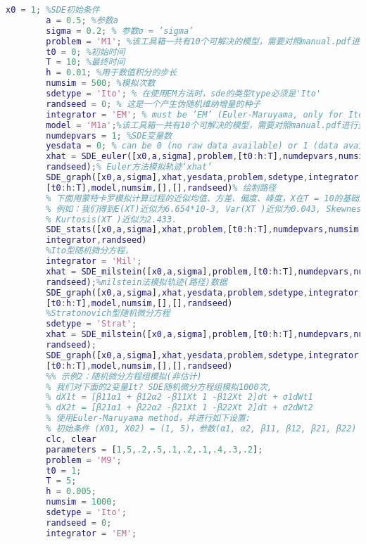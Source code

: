 \begin{lstlisting}[language= Matlab]
        x0 = 1; %SDE初始条件
        a = 0.5; %参数a
        sigma = 0.2; % 参数σ = ’sigma’
        problem = 'M1'; %该工具箱一共有10个可解决的模型，需要对照manual.pdf进行查看
        t0 = 0; %初始时间
        T = 10; %最终时间
        h = 0.01; %用于数值积分的步长
        numsim = 500; %模拟次数
        sdetype = 'Ito'; % 在使用EM方法时，sde的类型type必须是'Ito'
        randseed = 0; % 这是一个产生伪随机维纳增量的种子
        integrator = 'EM'; % must be ’EM’ (Euler-Maruyama, only for Ito SDEs) or ’Mil’
        model = 'M1a';%该工具箱一共有10个可解决的模型，需要对照manual.pdf进行查看
        numdepvars = 1; %SDE变量数
        yesdata = 0; % can be 0 (no raw data available) or 1 (data available)
        xhat = SDE_euler([x0,a,sigma],problem,[t0:h:T],numdepvars,numsim,sdetype,...
        randseed);% Euler方法模拟轨迹‘xhat’
        SDE_graph([x0,a,sigma],xhat,yesdata,problem,sdetype,integrator,numdepvars,...
        [t0:h:T],model,numsim,[],[],randseed)% 绘制路径
        % 下面用蒙特卡罗模拟计算过程的近似均值、方差、偏度、峰度，X在T = 10的基础上的模拟轨迹
        % 例如：我们得到E(XT)近似为6.654*10-3, Var(XT )近似为0.043, Skewness(XT )近似为0 and
        % Kurtosis(XT )近似为2.433.
        SDE_stats([x0,a,sigma],xhat,problem,[t0:h:T],numdepvars,numsim,sdetype,...
        integrator,randseed)
        %Ito型随机微分方程，
        integrator = 'Mil';
        xhat = SDE_milstein([x0,a,sigma],problem,[t0:h:T],numdepvars,numsim,sdetype,...
        randseed);%milstein法模拟轨迹(路径)数据
        SDE_graph([x0,a,sigma],xhat,yesdata,problem,sdetype,integrator,numdepvars,...
        [t0:h:T],model,numsim,[],[],randseed)
        %Stratonovich型随机微分方程
        sdetype = 'Strat';
        xhat = SDE_milstein([x0,a,sigma],problem,[t0:h:T],numdepvars,numsim,sdetype,...
        randseed);
        SDE_graph([x0,a,sigma],xhat,yesdata,problem,sdetype,integrator,numdepvars,...
        [t0:h:T],model,numsim,[],[],randseed)
        %% 示例2：随机微分方程组模拟(非估计)
        % 我们对下面的2变量It? SDE随机微分方程组模拟1000次,
        % dX1t = [β11α1 + β12α2 -β11Xt 1 -β12Xt 2]dt + σ1dWt1
        % dX2t = [β21α1 + β22α2 -β21Xt 1 -β22Xt 2]dt + σ2dWt2
        % 使用Euler-Maruyama method，并进行如下设置:
        % 初始条件 (X01, X02) = (1, 5)，参数(α1, α2, β11, β12, β21, β22) = (.2, .5, .1, .2, .1, .4, .3, .2), [t0, T] = [1, 5], h = 0.005.
        clc, clear
        parameters = [1,5,.2,.5,.1,.2,.1,.4,.3,.2];
        problem = 'M9';
        t0 = 1;
        T = 5;
        h = 0.005;
        numsim = 1000;
        sdetype = 'Ito';
        randseed = 0;
        integrator = 'EM';

\end{lstlisting}

